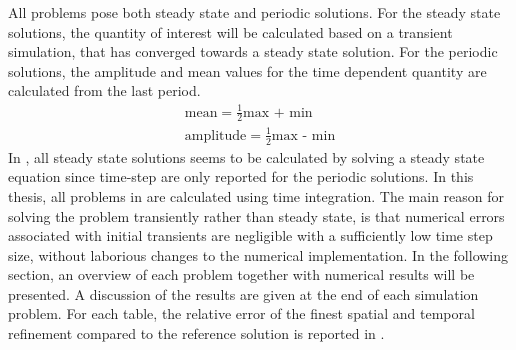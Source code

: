 \newpage
All problems pose both steady state and periodic solutions. For the steady state solutions, the quantity of interest will be calculated based on a transient simulation, that has converged towards a steady state solution. For the periodic solutions, the amplitude and mean values for the time dependent quantity are calculated from the last period.
\begin{align}
\text{mean} = \frac{1}{2} \text{max + min} \\
\text{amplitude} = \frac{1}{2} \text{max - min}
\label{icond}
\end{align}
 In \cite{Hron2006}, all steady state solutions seems to be calculated by solving a steady state equation since time-step are only reported for the periodic solutions. In this thesis, all problems in \cite{Hron2006} are calculated using time integration. The main reason for solving the problem transiently rather than steady state, is that numerical errors associated with initial transients are negligible with a sufficiently low time step size, without laborious changes to the numerical implementation. In the following section, an overview of each problem together with numerical results will be presented. A discussion of the results are given at the end of each simulation problem. For each table, the relative error of the finest spatial and temporal refinement compared to the reference solution is reported in \cite{Hron2006}.

